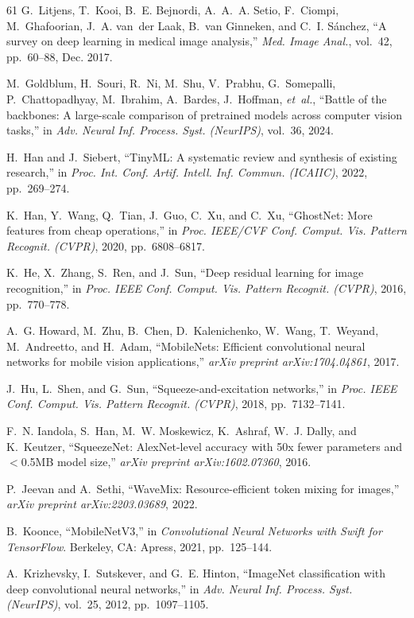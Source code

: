 \begin{thebibliography}{61}
G.~Litjens, T.~Kooi, B.~E. Bejnordi, A.~A.~A. Setio, F.~Ciompi, M.~Ghafoorian, J.~A. van~der Laak, B.~van Ginneken, and C.~I. S{\'a}nchez, ``A survey on deep learning in medical image analysis,'' \emph{Med. Image Anal.}, vol.~42, pp.~60--88, Dec. 2017. 

M.~Goldblum, H.~Souri, R.~Ni, M.~Shu, V.~Prabhu, G.~Somepalli, P.~Chattopadhyay, M.~Ibrahim, A.~Bardes, J.~Hoffman, \emph{et~al.}, ``Battle of the backbones: A large-scale comparison of pretrained models across computer vision tasks,'' in \emph{Adv. Neural Inf. Process. Syst. (NeurIPS)}, vol.~36, 2024.

H.~Han and J.~Siebert, ``TinyML: A systematic review and synthesis of existing research,'' in \emph{Proc. Int. Conf. Artif. Intell. Inf. Commun. (ICAIIC)}, 2022, pp.~269--274. 

K.~Han, Y.~Wang, Q.~Tian, J.~Guo, C.~Xu, and C.~Xu, ``GhostNet: More features from cheap operations,'' in \emph{Proc. IEEE/CVF Conf. Comput. Vis. Pattern Recognit. (CVPR)}, 2020, pp.~6808--6817.

K.~He, X.~Zhang, S.~Ren, and J.~Sun, ``Deep residual learning for image recognition,'' in \emph{Proc. IEEE Conf. Comput. Vis. Pattern Recognit. (CVPR)}, 2016, pp.~770--778.

A.~G. Howard, M.~Zhu, B.~Chen, D.~Kalenichenko, W.~Wang, T.~Weyand, M.~Andreetto, and H.~Adam, ``MobileNets: Efficient convolutional neural networks for mobile vision applications,'' \emph{arXiv preprint arXiv:1704.04861}, 2017.

J.~Hu, L.~Shen, and G.~Sun, ``Squeeze-and-excitation networks,'' in \emph{Proc. IEEE Conf. Comput. Vis. Pattern Recognit. (CVPR)}, 2018, pp.~7132--7141.

F.~N. Iandola, S.~Han, M.~W. Moskewicz, K.~Ashraf, W.~J. Dally, and K.~Keutzer, ``SqueezeNet: AlexNet-level accuracy with 50x fewer parameters and $<$0.5MB model size,'' \emph{arXiv preprint arXiv:1602.07360}, 2016.

P.~Jeevan and A.~Sethi, ``WaveMix: Resource-efficient token mixing for images,'' \emph{arXiv preprint arXiv:2203.03689}, 2022.

B.~Koonce, ``MobileNetV3,'' in \emph{Convolutional Neural Networks with Swift for TensorFlow}. Berkeley, CA: Apress, 2021, pp.~125--144.

A.~Krizhevsky, I.~Sutskever, and G.~E. Hinton, ``ImageNet classification with deep convolutional neural networks,'' in \emph{Adv. Neural Inf. Process. Syst. (NeurIPS)}, vol.~25, 2012, pp.~1097--1105.


\end{thebibliography}
